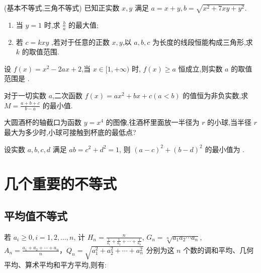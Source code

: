 \documentclass[a4paper , final]{ctexart}
\newenvironment{problem}[1]{%
  \item #1
  \par
  \vspace{8cm}
}{}
\begin{document}
\begin{problems}
  \begin{problem}
    {(基本不等式,三角不等式)
      已知正实数 $x,y$ 满足 $a=x+y,b=\sqrt{x^2+7xy+y^2}$.
      \begin{enumerate}[label=(\arabic*)]
        \item 当 $y=1$ 时,求 $\frac{b}{a}$ 的最大值;
        \item 若 $c=kxy$ ,若对于任意的正数 $x,y$,以 $a,b,c$ 为长度的线段恒能构成三角形,求 $k$ 的取值范围.
      \end{enumerate}
    }
  \end{problem}

  \begin{problem}
    {
      设 $f(x)=x^2-2ax+2$,当 $x\in[1,+\infty)$ 时, $f(x)\geq a$ 恒成立,则实数 $a$ 的取值范围是 \underline{\hspace{3cm}}.
    }
  \end{problem}

  \begin{problem}
    {
      对于一切实数 $a$,二次函数 $f(x)=ax^2+bx+c(a<b)$ 的值恒为非负实数,求 $M=\frac{a+b+c}{b-a}$ 的最小值.   
    }
  \end{problem}
  
  \begin{problem}
    {
      大圆酒杯的轴截口为函数 $y=x^4$ 的图像,往酒杯里面放一半径为 $r$ 的小球,当半径 $r$ 最大为多少时,小球可接触到杯底的最低点?
    }
  \end{problem}

  \begin{problem}
    {
      设实数 $a,b,c,d$ 满足 $ab=c^2+d^2=1$, 则 $(a-c)^2+(b-d)^2$ 的最小值为 \underline{\hspace{3cm}}.
    }
  \end{problem}
\end{problems}

\section*{几个重要的不等式}

\subsection*{平均值不等式}


若 $a_i \ge 0,i=1,2,\ldots,n$, 计 $H_n =\frac{n}{\frac{1}{a_1}+\frac{1}{a_2}+\cdots+\frac{1}{a_n}}$, $G_n = \sqrt[n]{a_1 a_2 \cdots a_n}$, $A_n = \frac{a_1+a_2+\cdots+a_n}{n}$，$Q_n = \sqrt{a_1^2+a_2^2+\cdots+a_n^2}$ 分别为这 $n$ 个数的调和平均、几何平均、算术平均和平方平均,则有:
\end{document}

